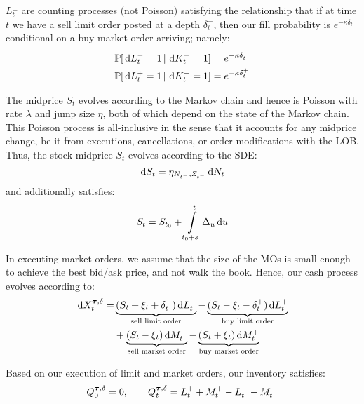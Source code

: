 $L^{\pm}_t$ are counting processes (not Poisson) satisfying the relationship that if at time $t$ we have a sell limit order posted at a depth $\delta^{-}_t$, then our fill probability is $e^{-\kappa \delta^{-}_t}$ conditional on a buy market order arriving; namely:
\begin{align}
\mathbb{P} [\,\mathrm{d} L^{-}_t = 1 \, | \, \,\mathrm{d} K^+_t = 1] & = e^{-\kappa \delta^{-}_t} \\
\mathbb{P} [\,\mathrm{d} L^{+}_t = 1 \, | \, \,\mathrm{d} K^{-}_t = 1] & = e^{-\kappa \delta^{+}_t}
\end{align}

The midprice $S_t$ evolves according to the Markov chain and hence is Poisson with rate $\lambda$ and jump size $\eta$, both of which depend on the state of the Markov chain. This Poisson process is all-inclusive in the sense that it accounts for any midprice change, be it from executions, cancellations, or order modifications with the LOB. Thus, the stock midprice $S_t$ evolves according to the SDE:
\begin{equation}\label{eq:stockprocess}
\,\mathrm{d} S_t = \eta_{N_{t^-},Z_{t^-}} \,\mathrm{d} N_t
\end{equation}
and additionally satisfies:
\begin{equation}\label{eq:stockintegral} 
S_t = S_{t_0} + \int\limits_{t_0 + s}^t \Delta_u \,\mathrm{d}u
\end{equation}

In executing market orders, we assume that the size of the MOs is small enough to achieve the best bid/ask price, and not walk the book. Hence, our cash process evolves according to:
\begin{equation}\label{eq:cashprocess}
\begin{split}
\,\mathrm{d} X^{\bm{\tau}, \delta}_t = 	&\underbrace{(S_t + \xi_t + \delta^{-}_t) \,\mathrm{d} L^{-}_t}_{\text{sell limit order}} - \underbrace{(S_t - \xi_t - \delta^{+}_t) \,\mathrm{d} L^{+}_t}_{\text{buy limit order}} \\
						&+ \underbrace{(S_t - \xi_t) \,\mathrm{d} M^{-}_t}_{\text{sell market order}} - \underbrace{(S_t + \xi_t) \,\mathrm{d} M^{+}_t}_{\text{buy market order}}
\end{split}
\end{equation}

Based on our execution of limit and market orders, our inventory satisfies:
\begin{equation}\label{eq:inventory}
Q^{\bm{\tau}, \delta}_0 = 0, \qquad Q^{\bm{\tau}, \delta}_t = L^+_t + M^+_t - L^-_t - M^-_t
\end{equation}

